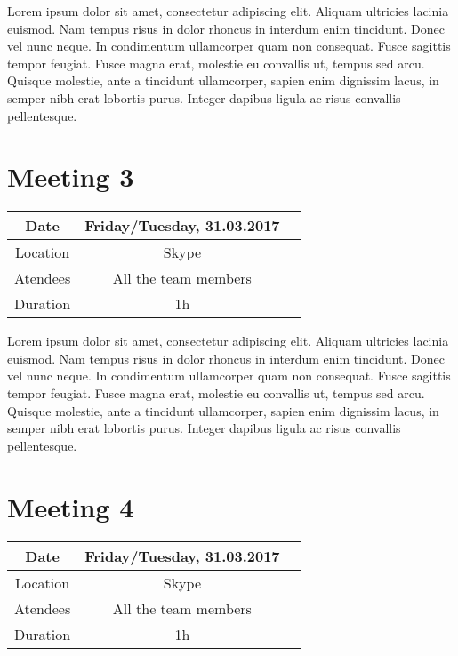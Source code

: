 Lorem ipsum dolor sit amet, consectetur adipiscing elit. Aliquam ultricies lacinia euismod. Nam tempus risus in dolor rhoncus in interdum enim tincidunt. Donec vel nunc neque. In condimentum ullamcorper quam non consequat. Fusce sagittis tempor feugiat. Fusce magna erat, molestie eu convallis ut, tempus sed arcu. Quisque molestie, ante a tincidunt ullamcorper, sapien enim dignissim lacus, in semper nibh erat lobortis purus. Integer dapibus ligula ac risus convallis pellentesque.

\section{Meeting 3}
\begin{center}
	\begin{tabular}{| c | c | c }
		\hline
		Date & Friday/Tuesday, 	31.03.2017   \\
		\hline
		Location & Skype  \\  
		\hline
		Atendees & All the team members   \\
		\hline
		Duration & 1h  \\
		\hline
	\end{tabular}	
\end{center}


Lorem ipsum dolor sit amet, consectetur adipiscing elit. Aliquam ultricies lacinia euismod. Nam tempus risus in dolor rhoncus in interdum enim tincidunt. Donec vel nunc neque. In condimentum ullamcorper quam non consequat. Fusce sagittis tempor feugiat. Fusce magna erat, molestie eu convallis ut, tempus sed arcu. Quisque molestie, ante a tincidunt ullamcorper, sapien enim dignissim lacus, in semper nibh erat lobortis purus. Integer dapibus ligula ac risus convallis pellentesque.

\section{Meeting 4}
\begin{center}
	\begin{tabular}{| c | c | c }
		\hline
		Date & Friday/Tuesday, 	31.03.2017   \\
		\hline
		Location & Skype  \\  
		\hline
		Atendees & All the team members   \\
		\hline
		Duration & 1h  \\
		\hline
	\end{tabular}	
\end{center}


